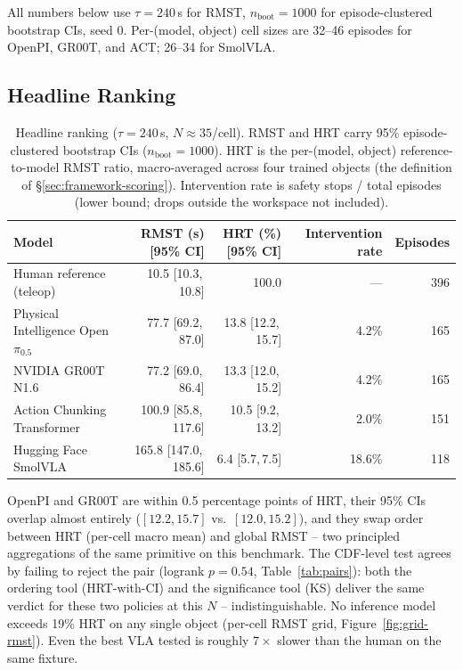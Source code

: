 \documentclass{article}
\begin{document}
All numbers below use $\tau = 240$\,s for RMST, $n_{\text{boot}} = 1000$ for episode-clustered bootstrap CIs, seed $0$. Per-(model, object) cell sizes are 32--46 episodes for OpenPI, GR00T, and ACT; 26--34 for SmolVLA.

\subsection{Headline Ranking}\label{sec:res-headline}

\begin{table}[h]
\centering
\small
\begin{tabular}{lrrrr}
\toprule
Model & RMST (s) [95\% CI] & HRT (\%) [95\% CI] & Intervention rate & Episodes \\
\midrule
Human reference (teleop) & 10.5 [10.3,\,10.8] & 100.0 & --- & 396 \\
\midrule
Physical Intelligence Open $\pi_{0.5}$ & 77.7 [69.2,\,87.0] & 13.8 [12.2,\,15.7] & 4.2\% & 165 \\
NVIDIA GR00T N1.6 & 77.2 [69.0,\,86.4] & 13.3 [12.0,\,15.2] & 4.2\% & 165 \\
Action Chunking Transformer & 100.9 [85.8,\,117.6] & 10.5 [9.2,\,13.2] & 2.0\% & 151 \\
Hugging Face SmolVLA & 165.8 [147.0,\,185.6] & 6.4 [5.7,\,7.5] & 18.6\% & 118 \\
\bottomrule
\end{tabular}
\caption{Headline ranking ($\tau = 240$\,s, $N \approx 35$/cell). RMST and HRT carry 95\% episode-clustered bootstrap CIs ($n_\text{boot} = 1000$). HRT is the per-(model, object) reference-to-model RMST ratio, macro-averaged across four trained objects (the definition of \S\ref{sec:framework-scoring}). Intervention rate is safety stops / total episodes (lower bound; drops outside the workspace not included).}
\label{tab:headline}
\end{table}

OpenPI and GR00T are within 0.5 percentage points of HRT, their 95\% CIs overlap almost entirely ($[12.2, 15.7]$ vs.\ $[12.0, 15.2]$), and they swap order between HRT (per-cell macro mean) and global RMST -- two principled aggregations of the same primitive on this benchmark. The CDF-level test agrees by failing to reject the pair (logrank $p = 0.54$, Table~\ref{tab:pairs}): both the ordering tool (HRT-with-CI) and the significance tool (KS) deliver the same verdict for these two policies at this $N$ -- indistinguishable. No inference model exceeds 19\% HRT on any single object (per-cell RMST grid, Figure~\ref{fig:grid-rmst}). Even the best VLA tested is roughly $7\times$ slower than the human on the same fixture.
\end{document}
